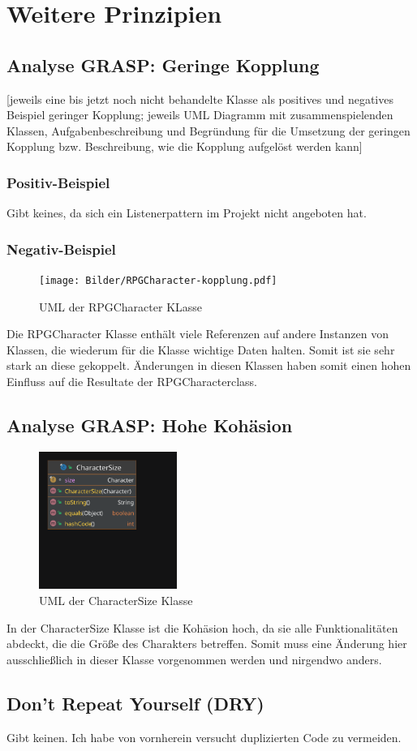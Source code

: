 \chapter{Weitere Prinzipien}

\section{Analyse GRASP: Geringe Kopplung}
[jeweils eine bis jetzt noch nicht behandelte Klasse als positives und negatives Beispiel geringer Kopplung; jeweils UML Diagramm mit zusammenspielenden Klassen, Aufgabenbeschreibung und Begründung für die Umsetzung der geringen Kopplung bzw. Beschreibung, wie die Kopplung aufgelöst werden kann]
\subsection{Positiv-Beispiel}
Gibt keines, da sich ein Listenerpattern im Projekt nicht angeboten hat.
\subsection{Negativ-Beispiel}
\begin{figure}[H]
	\centering
	\texttt{[image: Bilder/RPGCharacter-kopplung.pdf]}
	\caption{UML der RPGCharacter KLasse}
	\label{fig:kopplung}
\end{figure}
Die RPGCharacter Klasse enthält viele Referenzen auf andere Instanzen von Klassen, die wiederum für die Klasse wichtige Daten halten. Somit ist sie sehr stark an diese gekoppelt. Änderungen in diesen Klassen haben somit einen hohen Einfluss auf die Resultate der RPGCharacterclass.

\section{Analyse GRASP: Hohe Kohäsion}
\begin{figure}[H]
	\centering
	\includegraphics[width=0.4\textwidth]{Bilder/CharacterSize.pdf}
	\caption{UML der CharacterSize Klasse}
	\label{fig:Size}
\end{figure}
In der CharacterSize Klasse ist die Kohäsion hoch, da sie alle Funktionalitäten abdeckt, die die Größe des Charakters betreffen. Somit muss eine Änderung hier ausschließlich in dieser Klasse vorgenommen werden und nirgendwo anders.
\section{Don't Repeat Yourself (DRY)}
Gibt keinen. Ich habe von vornherein versucht duplizierten Code zu vermeiden.